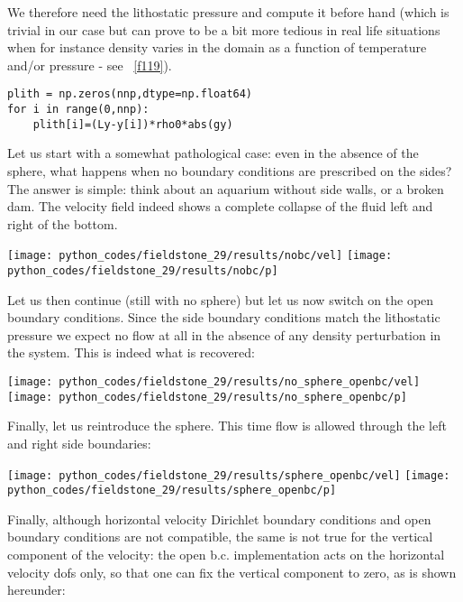 We therefore need the lithostatic pressure and compute it before hand (which is trivial in 
our case but can prove to be a bit more tedious in real life situations when for instance
density varies in the domain as a function of temperature and/or pressure 
- see \stone~\ref{f119}).

\begin{lstlisting}
plith = np.zeros(nnp,dtype=np.float64)
for i in range(0,nnp):
    plith[i]=(Ly-y[i])*rho0*abs(gy)
\end{lstlisting}


Let us start with a somewhat pathological case: even in the absence of the 
sphere, what happens when no 
boundary conditions are prescribed on the sides? The answer is simple: 
think about an aquarium without side walls, or a broken dam. The velocity field 
indeed shows a complete collapse of the fluid left and right of the bottom.

\begin{center}
\texttt{[image: python\_codes/fieldstone\_29/results/nobc/vel]}
\texttt{[image: python\_codes/fieldstone\_29/results/nobc/p]}
\end{center}

Let us then continue (still with no sphere) but let us now switch on the open 
boundary conditions. Since the side boundary conditions match the lithostatic 
pressure we expect no flow at all in the absence of any density perturbation
in the system. This is indeed what is recovered:

\begin{center}
\texttt{[image: python\_codes/fieldstone\_29/results/no\_sphere\_openbc/vel]}
\texttt{[image: python\_codes/fieldstone\_29/results/no\_sphere\_openbc/p]}
\end{center}
 
Finally, let us reintroduce the sphere. This 
time flow is allowed through the left and right side boundaries:

\begin{center}
\texttt{[image: python\_codes/fieldstone\_29/results/sphere\_openbc/vel]}
\texttt{[image: python\_codes/fieldstone\_29/results/sphere\_openbc/p]}
\end{center}

Finally, although horizontal velocity Dirichlet boundary conditions and open 
boundary conditions are not compatible, the same is not true for the vertical component 
of the velocity: the open b.c. implementation acts on the horizontal velocity 
dofs only, so that one can fix the vertical component to zero, as is shown hereunder:

